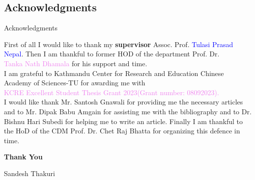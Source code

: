 \documentclass{beamer}
\begin{document}
\subsection{Acknowledgments}
\begin{frame}{Acknowledgments}

  First of all I would like to thank my \textbf{supervisor} Assoc. Prof. \textcolor{blue}{Tulasi Prasad Nepal}. Then I am thankful to former HOD of the department Prof. Dr.\\
  \textcolor{violet}{Tanka Nath Dhamala} for his support and time.\\[4mm]

I am grateful to Kathmandu Center for Research and Education Chinese Academy of Sciences-TU for awarding me with \\
\textcolor{violet}{KCRE Excellent Student Thesis Grant 2023(Grant number: 08092023).}\\[4mm]

I would like thank  Mr. \textcolor{green!50!black}{Santosh Gnawali} for providing me the necessary articles and to Mr. \textcolor{green!50!black}{Dipak Babu Amgain} for assisting me with the bibliography and to Dr. \textcolor{green!50!black}{Bishnu Hari Subedi} for helping me to write an article. Finally I am thankful to the HoD of the CDM  Prof. Dr. \textcolor{green!50!black}{Chet Raj Bhatta} for organizing this defence in time.
\\[4mm]
\begin{center}
  \large \bfseries \color{magenta}
  Thank You
  \end{center}
\begin{minipage}{1\textwidth}
	\begin{flushright}
		{\color {blue} Sandesh Thakuri}\\
	\end{flushright}
      \end{minipage}
\end{frame}
\end{document}
